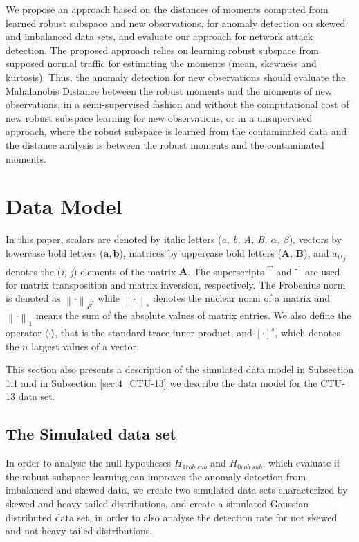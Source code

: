 We propose an approach based on the distances of moments computed from learned robust subspace and new observations, for anomaly detection on skewed and imbalanced data sets, and evaluate our approach for network attack detection. The proposed approach relies on learning robust subspace from supposed normal traffic for estimating the moments (mean, skewness and kurtosis). Thus, the anomaly detection for new observations should evaluate the Mahalanobis Distance between the robust moments and the moments of new observations, in a semi-supervised fashion and without the computational cost of new robust subspace learning for new observations, or in a unsupervised approach, where the robust subspace is learned from the contaminated data and the distance analysis is between the robust moments and the contaminated moments. 


\section{Data Model}
\label{sec:4_datamodel}

In this paper, scalars are denoted by italic letters (\emph{a, b, A, B, $\alpha$, $\beta$}), vectors by lowercase bold letters ($\pmb{a}, \pmb{b}$), matrices by uppercase bold letters ($\pmb{A}$, $\pmb{B}$), and $a_i,_j$ denotes the (\emph{i, j}) elements of the matrix $\pmb{A}$. The superscripts \textsuperscript{T} and \textsuperscript{-1} are used for matrix transposition and matrix inversion, respectively. The Frobenius norm is denoted as $\left\| \mathord{\cdot} \right\|_F$, while $\left\| \mathord{\cdot} \right\|_*$ denotes the nuclear norm of a matrix and $\left\| \mathord{\cdot} \right\|_1$ means the sum of the absolute values of matrix entries. We also define the operator $\langle \mathord{\cdot} \rangle$, that is the standard trace inner product, and $[ \mathord{\cdot} ]^s$, which denotes the $n$ largest values of a vector.

This section also presents a description of the simulated data model in Subsection \ref{sec:4_simulation} and in Subsection \ref{sec:4_CTU-13} we describe the data model for the CTU-13 data set.


\subsection{The Simulated data set}
\label{sec:4_simulation}

In order to analyse the null hypotheses $H_{1rob.sub}$ and $H_{0rob.sub}$, which evaluate if the robust subspace learning can improves the anomaly detection from imbalanced and skewed data, we create two simulated data sets characterized by skewed and heavy tailed distributions, and create a simulated Gaussian distributed data set, in order to also analyse the detection rate for not skewed and not heavy tailed distributions.

